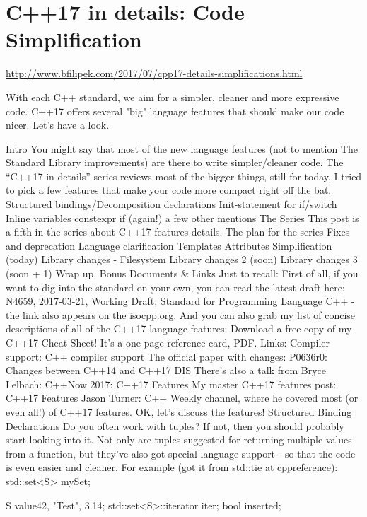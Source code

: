 \section{C++17 in details: Code Simplification}

\url{http://www.bfilipek.com/2017/07/cpp17-details-simplifications.html}

With each C++ standard, we aim for a simpler, cleaner and more expressive code. C++17 offers several "big" language features that should make our code nicer. Let’s have a look.

Intro
You might say that most of the new language features (not to mention The Standard Library improvements) are there to write simpler/cleaner code. The “C++17 in details” series reviews most of the bigger things, still for today, I tried to pick a few features that make your code more compact right off the bat.
Structured bindings/Decomposition declarations
Init-statement for if/switch
Inline variables
constexpr if (again!)
a few other mentions
The Series
This post is a fifth in the series about C++17 features details.
The plan for the series
Fixes and deprecation
Language clarification
Templates
Attributes
Simplification (today)
Library changes - Filesystem
Library changes 2 (soon)
Library changes 3 (soon + 1)
Wrap up, Bonus
Documents & Links
Just to recall:
First of all, if you want to dig into the standard on your own, you can read the latest draft here: 
N4659, 2017-03-21, Working Draft, Standard for Programming Language C++ - the link also appears on the isocpp.org.
And you can also grab my list of concise descriptions of all of the C++17 language features:
Download a free copy of my C++17 Cheat Sheet! 
It’s a one-page reference card, PDF.
Links:
Compiler support: C++ compiler support
The official paper with changes: P0636r0: Changes between C++14 and C++17 DIS
There’s also a talk from Bryce Lelbach: C++Now 2017: C++17 Features
My master C++17 features post: C++17 Features
Jason Turner: C++ Weekly channel, where he covered most (or even all!) of C++17 features.
OK, let’s discuss the features!
Structured Binding Declarations
Do you often work with tuples?
If not, then you should probably start looking into it. Not only are tuples suggested for returning multiple values from a function, but they've also got special language support - so that the code is even easier and cleaner.
For example (got it from std::tie at cppreference):
std::set<S> mySet;

S value{42, "Test", 3.14};
std::set<S>::iterator iter;
bool inserted;

